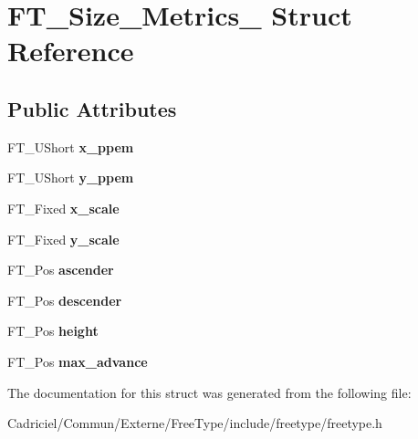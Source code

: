 \hypertarget{struct_f_t___size___metrics__}{\section{F\-T\-\_\-\-Size\-\_\-\-Metrics\-\_\- Struct Reference}
\label{struct_f_t___size___metrics__}
}
\subsection*{Public Attributes}
\begin{DoxyCompactItemize}
\item 
\hypertarget{struct_f_t___size___metrics___abb42b175a3450e9d8b84483f166d6c8a}{F\-T\-\_\-\-U\-Short {\bfseries x\-\_\-ppem}}\label{struct_f_t___size___metrics___abb42b175a3450e9d8b84483f166d6c8a}

\item 
\hypertarget{struct_f_t___size___metrics___abcdb70cb9e39a74679bc39c07f3275f7}{F\-T\-\_\-\-U\-Short {\bfseries y\-\_\-ppem}}\label{struct_f_t___size___metrics___abcdb70cb9e39a74679bc39c07f3275f7}

\item 
\hypertarget{struct_f_t___size___metrics___a5e92028bb9881e107a6fb75d557eaff1}{F\-T\-\_\-\-Fixed {\bfseries x\-\_\-scale}}\label{struct_f_t___size___metrics___a5e92028bb9881e107a6fb75d557eaff1}

\item 
\hypertarget{struct_f_t___size___metrics___a1f8b1cb3538b9920127f721dd061379d}{F\-T\-\_\-\-Fixed {\bfseries y\-\_\-scale}}\label{struct_f_t___size___metrics___a1f8b1cb3538b9920127f721dd061379d}

\item 
\hypertarget{struct_f_t___size___metrics___ab5fde60a2661d7b774f61c264a2a6070}{F\-T\-\_\-\-Pos {\bfseries ascender}}\label{struct_f_t___size___metrics___ab5fde60a2661d7b774f61c264a2a6070}

\item 
\hypertarget{struct_f_t___size___metrics___a9b2ca3a4391803e8721ed99eb9953d52}{F\-T\-\_\-\-Pos {\bfseries descender}}\label{struct_f_t___size___metrics___a9b2ca3a4391803e8721ed99eb9953d52}

\item 
\hypertarget{struct_f_t___size___metrics___ae3361e264fb8a9e669f118bdb244439b}{F\-T\-\_\-\-Pos {\bfseries height}}\label{struct_f_t___size___metrics___ae3361e264fb8a9e669f118bdb244439b}

\item 
\hypertarget{struct_f_t___size___metrics___ac315a7a834ac1a57c7169ce021718958}{F\-T\-\_\-\-Pos {\bfseries max\-\_\-advance}}\label{struct_f_t___size___metrics___ac315a7a834ac1a57c7169ce021718958}

\end{DoxyCompactItemize}


The documentation for this struct was generated from the following file\-:\begin{DoxyCompactItemize}
\item 
Cadriciel/\-Commun/\-Externe/\-Free\-Type/include/freetype/freetype.\-h\end{DoxyCompactItemize}
